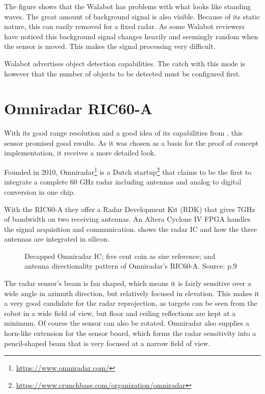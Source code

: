 The figure shows that the Walabot has problems with what looks like
standing waves. The great amount of background signal is also visible.
Because of its static nature, this can easily removed for a fixed radar.
As some Walabot reviewers have noticed \cite{Valens2016} this background
signal changes heavily and seemingly random when the sensor is moved.
This makes the signal processing very difficult.

Walabot advertises object detection capabilities. The catch with this
mode is however that the number of objects to be detected must be
configured first.

\section{Omniradar RIC60-A}\label{omniradar}

With its good range resolution and a good idea of its capabilities from
\cite{Ernst2016}, this sensor promised good results. As it was chosen as
a basis for the proof of concept implementation, it receives a more
detailed look.

Founded in 2010, Omniradar\footnote{\url{https://www.omniradar.com/}} is a Dutch
startup\footnote{\url{https://www.crunchbase.com/organization/omniradar}} that
claims to be the first to integrate a complete 60 GHz radar including
antennas and analog to digital conversion in one chip.

With the RIC60-A they offer a Radar Development Kit (RDK) that gives
7GHz of bandwidth on two receiving antennas. An Altera Cyclone IV FPGA
handles the signal acquisition and communication.  shows the
radar IC and how the three antennas are integrated in silicon.

\begin{figure}[htbp]
    \centering
    \def\svgwidth{\linewidth}
    
    \caption{Decapped Omniradar IC; five cent coin as size reference; and antenna directionality pattern of Omniradar's RIC60-A. Source: \cite{Brouwer2015} p.9}
    \label{fig:slide_RIC60A}
\end{figure}

The radar sensor's beam is fan shaped, which means it is fairly
sensitive over a wide angle in azimuth direction, but relatively focused
in elevation. This makes it a very good candidate for the radar
reprojection, as targets can be seen from the robot in a wide field of
view, but floor and ceiling reflections are kept at a minimum. Of course
the sensor can also be rotated. Omniradar also supplies a horn-like
extension for the sensor board, which forms the radar sensitivity into a
pencil-shaped beam that is very focused at a narrow field of view.

